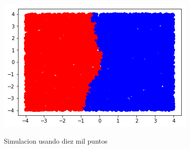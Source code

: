 \documentclass[12pt, a4paper]{article}
\begin{document}
\begin{figure}[H]
\begin{minipage}[b]{.3\linewidth}
		\includegraphics[width = \textwidth]{diez_mil_puntos_13_vecino}
		\label{fig:diez_mil_13}
	\end{minipage}
	\caption{Simulacion usando diez mil puntos}\label{fig:diez_mil}
\end{figure}
\end{document}
